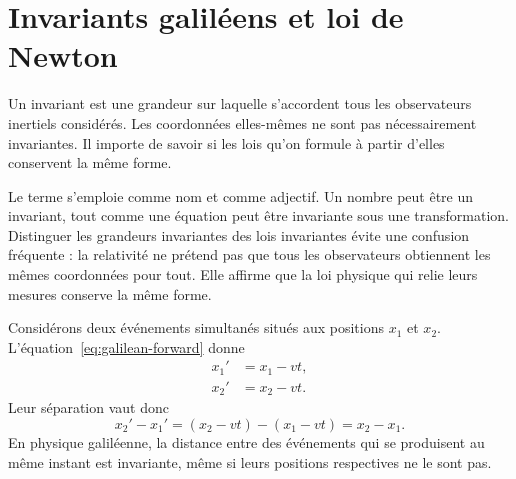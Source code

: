 \begin{classroomqa}\end{classroomqa}

\section{Invariants galiléens et loi de Newton}

Un invariant est une grandeur sur laquelle s’accordent tous les observateurs inertiels considérés. Les coordonnées elles-mêmes ne sont pas nécessairement invariantes. Il importe de savoir si les lois qu’on formule à partir d’elles conservent la même forme.

Le terme s’emploie comme nom et comme adjectif. Un nombre peut être un invariant, tout comme une équation peut être invariante sous une transformation. Distinguer les grandeurs invariantes des lois invariantes évite une confusion fréquente : la relativité ne prétend pas que tous les observateurs obtiennent les mêmes coordonnées pour tout. Elle affirme que la loi physique qui relie leurs mesures conserve la même forme.

Considérons deux événements simultanés situés aux positions \(x_1\) et \(x_2\). L’équation~\eqref{eq:galilean-forward} donne
\begin{align}
x_1'&=x_1-vt,\\
x_2'&=x_2-vt.
\end{align}
Leur séparation vaut donc
\begin{equation}
x_2'-x_1'=(x_2-vt)-(x_1-vt)=x_2-x_1.
\end{equation}
En physique galiléenne, la distance entre des événements qui se produisent au même instant est invariante, même si leurs positions respectives ne le sont pas.

